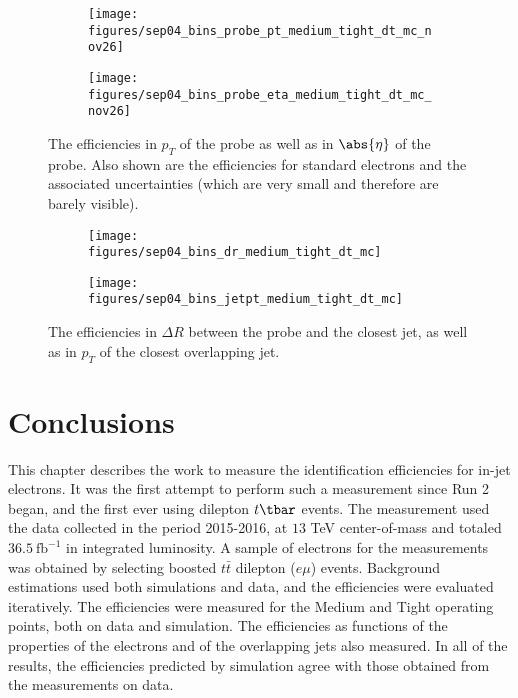 \begin{figure}[H]
	\begin{subfigure}{0.5\textwidth}
		\texttt{[image: figures/sep04\_bins\_probe\_pt\_medium\_tight\_dt\_mc\_nov26]}
	\end{subfigure}
	\begin{subfigure}{0.5\textwidth}
		\texttt{[image: figures/sep04\_bins\_probe\_eta\_medium\_tight\_dt\_mc\_nov26]}
	\end{subfigure}

	\centering
	\caption{The efficiencies in $p_T$ of the probe as well as in $\abs{\eta}$ of the
		probe. Also shown are the efficiencies for standard electrons and the associated 
		uncertainties (which are very small and therefore are barely visible).}
	\label{f:binspt01}
\end{figure}

\begin{figure}[H]
	\begin{subfigure}{0.5\textwidth}
		\texttt{[image: figures/sep04\_bins\_dr\_medium\_tight\_dt\_mc]}
	\end{subfigure}
	\begin{subfigure}{0.5\textwidth}
		\texttt{[image: figures/sep04\_bins\_jetpt\_medium\_tight\_dt\_mc]}
	\end{subfigure}

	\centering
	\caption{The efficiencies in $\Delta R$ between the probe and the closest jet,
		as well as in $p_T$ of the closest overlapping jet.}
	\label{f:binspt02}
\end{figure}


\section{Conclusions}\label{s:eidcon}

This chapter describes the work to measure the identification efficiencies for
in-jet electrons. It was the first attempt to perform such a measurement since
Run 2 began, and the first ever using dilepton $t\tbar$ events. The measurement
used the data collected in the period 2015-2016, at $13$ TeV center-of-mass and
totaled $36.5~\text{fb}^{-1}$ in integrated luminosity. A sample of electrons
for the measurements was obtained by selecting boosted $t\bar{t}$ dilepton
($e\mu$) events. Background estimations used both simulations and data, and the
efficiencies were evaluated iteratively. The efficiencies were measured for the
Medium and Tight operating points, both on data and simulation. The
efficiencies as functions of the properties of the electrons and of the
overlapping jets also measured. In all of the results, the efficiencies
predicted by simulation agree with those obtained from the measurements on
data.


